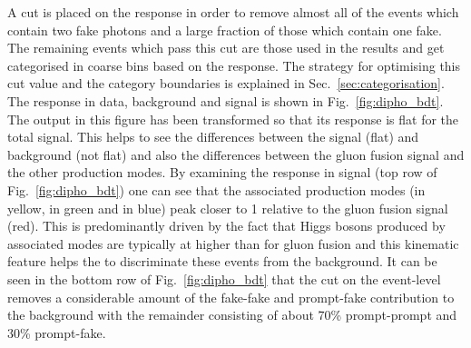 A cut is placed on the \BDT response in order to remove almost all of the events which contain two fake photons and a large fraction of those which contain one fake. The remaining events which pass this cut are those used in the results and get categorised in coarse bins based on the \BDT response. The strategy for optimising this cut value and the category boundaries is explained in Sec.~\ref{sec:categorisation}. The \BDT response in data, background and signal is shown in Fig.~\ref{fig:dipho_bdt}. The \BDT output in this figure has been transformed so that its response is flat for the total signal. This helps to see the differences between the signal (flat) and background (not flat) and also the differences between the gluon fusion signal and the other production modes. By examining the \BDT response in signal (top row of Fig.~\ref{fig:dipho_bdt}) one can see that the associated production modes (\VBF in yellow, \VH in green and \ttH in blue) peak closer to 1 relative to the gluon fusion signal (red). This is predominantly driven by the fact that Higgs bosons produced by associated modes are typically at higher \pT than for gluon fusion and this kinematic feature helps the \BDT to discriminate these events from the background. It can be seen in the bottom row of Fig.~\ref{fig:dipho_bdt} that the cut on the event-level \BDT removes a considerable amount of the fake-fake and prompt-fake contribution to the background with the remainder consisting of about 70\% prompt-prompt and 30\% prompt-fake.

